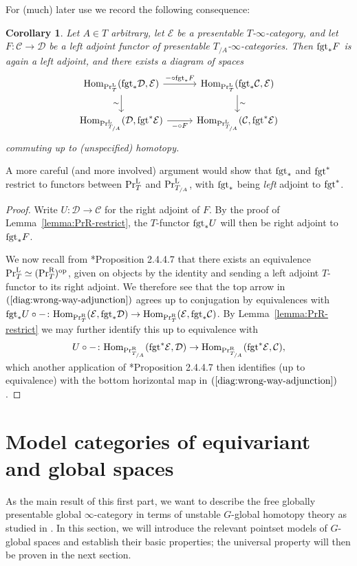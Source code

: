 \documentclass[reqno]{memo-l}
\theoremstyle{mythm}
\newtheorem{cor}[thm]{Corollary}
\theoremstyle{definition}
\numberwithin{equation}{section}
\newcommand{\Cc}{{\mathcal{C}}}
\newcommand{\Dd}{{\mathcal{D}}}
\newcommand{\Ee}{{\mathcal{E}}}
\newcommand{\PrL}{\textup{Pr}^{\textup{L}}}
\newcommand{\PrR}{\textup{Pr}^{\textup{R}}}
\newcommand{\PrLT}{\textup{Pr}^{\textup{L}}_{T}}
\newcommand{\PrRT}{\textup{Pr}^{\textup{R}}_{T}}
\renewcommand{\hom}{\textup{hom}}
\newcommand{\op}{{\textup{op}}}
\renewcommand{\hom}{{\textup{Hom}}}
\newcommand{\fgt}{\textup{fgt}}
\begin{document}
For (much) later use we record the following consequence:

\begin{cor}\label{cor:PrLT-ambidextrous-fgt}
    Let $A\in T$ arbitrary, let $\Ee$ be a presentable $T$-$\infty$-category, and let $F\colon\Cc\to\Dd$ be a left adjoint functor of presentable $T_{/A}$-$\infty$-categories. Then $\fgt_*F$ is again a left adjoint, and there exists a diagram of spaces
    \begin{equation}\label{diag:wrong-way-adjunction}
        \begin{tikzcd}
            \hom_{\PrLT}(\fgt_*\Dd,\Ee)\arrow[d,"\sim"']\arrow[r, "{-}\circ\fgt_*F"] &[.25em] \hom_{\PrLT}(\fgt_*\Cc,\Ee)\arrow[d,"\sim"]\\
            \hom_{\PrL_{T_{/A}}}(\Dd,\fgt^*\Ee)\arrow[r,"{-}\circ F"'] & \hom_{\PrL_{T_{/A}}}(\Cc,\fgt^*\Ee)
        \end{tikzcd}
    \end{equation}
    commuting up to (unspecified) homotopy.
\end{cor}

A more careful (and more involved) argument would show that $\fgt_*$ and $\fgt^*$ restrict to functors between $\PrLT$ and $\PrL_{T_{/A}}$, with $\fgt_*$ being \emph{left} adjoint to $\fgt^*$.

\begin{proof}
    Write $U\colon\Dd\to\Cc$ for the right adjoint of $F$. By the proof of Lemma~\ref{lemma:PrR-restrict}, the $T$-functor $\fgt_*U$ will then be right adjoint to $\fgt_*F$.

    We now recall from \cite{martiniwolf2022presentable}*{Proposition 2.4.4.7} that there exists an equivalence $\PrLT\simeq(\PrRT)^\op$, given on objects by the identity and sending a left adjoint $T$-functor to its right adjoint. We therefore see that the top arrow in $(\ref{diag:wrong-way-adjunction})$ agrees up to conjugation by equivalences with 
    $\fgt_*U\circ{-}\colon\hom_{\PrRT}(\Ee,\fgt_*\Dd)\to\hom_{\PrRT}(\Ee,\fgt_*\Cc)$.
    By Lemma~\ref{lemma:PrR-restrict} we may further identify this up to equivalence with 
    \[
        U\circ{-}\colon\smash{\hom_{\PrR_{T_{/A}}}(\fgt^*\Ee,\Dd)\to\hom_{{\PrR_{T_{/A}}}}}(\fgt^*\Ee,\Cc),
    \]
    which another application of \cite{martiniwolf2022presentable}*{Proposition 2.4.4.7} then identifies (up to equivalence) with the bottom horizontal map in $(\ref{diag:wrong-way-adjunction})$.
\end{proof}

\section{Model categories of equivariant and global spaces}\label{sec:G-global-spaces}
As the main result of this first part, we want to describe the free globally presentable global $\infty$-category in terms of unstable $G$-global homotopy theory as studied in \cites{schwede2018global,barrero2021}. In this section, we will introduce the relevant pointset models of $G$-global spaces and establish their basic properties; the universal property will then be proven in the next section.
\end{document}
